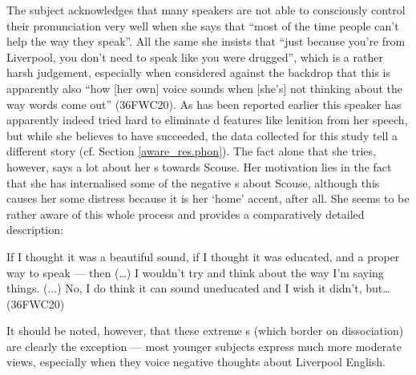 The subject acknowledges that many speakers are not able to consciously control their pronunciation very well when she says that ``most of the time people can't help the way they speak''.
All the same she insists that ``just because you're from Liverpool, you don't need to speak like you were drugged'', which is a rather harsh judgement, especially when considered against the backdrop that this is apparently also ``how [her own] voice sounds when [she's] not thinking about the way words come out'' (36FWC20).
As has been reported earlier this speaker has apparently indeed tried hard to eliminate d features like lenition from her speech, but while she believes to have succeeded, the data collected for this study tell a different story (cf. Section \ref{aware_res.phon}).
The fact alone that she tries, however, says a lot about her s towards Scouse.
Her motivation lies in the fact that she has internalised some of the negative s about Scouse, although this causes her some distress because it is her `home' accent, after all.
She seems to be rather aware of this whole process and provides a comparatively detailed description:
\begin{example}
	If I thought it was a beautiful sound, if I thought it was educated, and  a proper way to speak --- then (\ldots) I wouldn't try and think about the way I'm saying things. (...) No, I do think it can sound uneducated and I wish it didn't, but\ldots (36FWC20)
\end{example}
It should be noted, however, that these extreme s (which border on dissociation) are clearly the exception --- most younger subjects express much more moderate views, especially when they voice negative thoughts about Liverpool English.